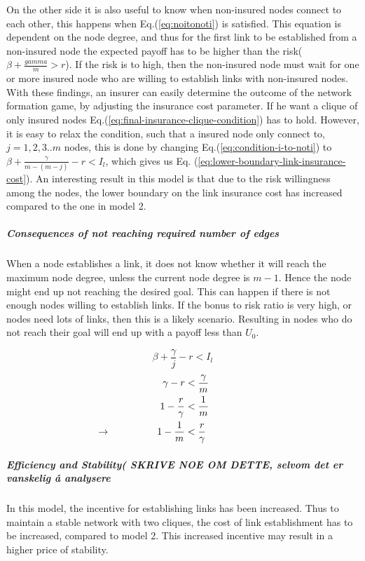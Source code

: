 On the other side it is also useful to know when non-insured nodes connect to each other, this happens when Eq.(\ref{eq:noitonoti}) is satisfied. This equation is dependent on the node degree, and thus for the first link to be established from a non-insured node the expected payoff has to be higher than the risk( $\beta+\frac{gamma}{m}>r$). If the risk is to high, then the non-insured node must wait for one or more insured node who are willing to establish links with non-insured nodes.
With these findings, an insurer can easily determine the outcome of the network formation game, by adjusting the
insurance cost parameter. If he want a clique of only insured nodes Eq.(\ref{eq:final-insurance-clique-condition}) has to
hold. However, it is easy to relax the condition, such that a insured node only connect to, $j=1,2,3..m$ nodes,
   this is done by changing Eq.(\ref{eq:condition-i-to-noti}) to $\beta+\frac{\gamma}{m-(m-j)}-r<I_{l}$, which
    gives us Eq. (\ref{eq:lower-boundary-link-insurance-cost}).
An interesting result in this model is that due to the risk willingness among the nodes, the lower boundary on the link insurance cost has increased compared to the one in model 2. 

\subparagraph{Consequences of not reaching required number of edges}
When a node establishes a link, it does not know whether it will reach the maximum node degree, unless the current node degree is $m-1$. Hence the node might end up not reaching the desired goal. This can happen if there is not enough nodes willing to establish links. If the bonus to risk ratio is very high, or nodes need lots of links, then this is a likely scenario. Resulting in nodes who do not reach their goal will end up with a payoff less than $U_{0}$. 

\begin{equation} 
\beta+\frac{\gamma}{j}-r<I_{l}
\label{eq:lower-boundary-link-insurance-cost}
\end{equation} 
\begin{eqnarray}
\gamma-r &<\frac{\gamma}{m}\nonumber \\
1-\frac{r}{\gamma}&<\frac{1}{m} \nonumber \\
\llap{$\rightarrow$\hspace{50pt}}1-\frac{1}{m}&<\frac{r}{\gamma}
\label{eq:noinsuredcliqueconditon}
\end{eqnarray}


\subparagraph{Efficiency and Stability( SKRIVE NOE OM DETTE, selvom det er vanskelig å analysere}
In this model, the incentive for establishing links has been increased. Thus to maintain a stable network with two cliques, the cost of link establishment has to be increased, compared to model 2. This increased incentive may result in a higher price of stability. 

